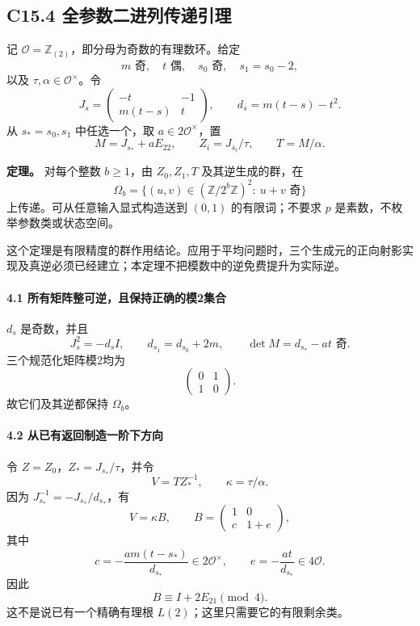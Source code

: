 \subsection*{\texorpdfstring{{C15.4} {全参数二进列传递引理}}{C15.4 全参数二进列传递引理}}\label{C15-h107}

{记} \(\mathcal O=\mathbb Z_{(2)}\){，即分母为奇数的有理数环。给定} \[
m\text{ 奇},\quad t\text{ 偶},\quad s_0\text{ 奇},\quad s_1=s_0-2,
\] {以及} \(\tau,\alpha\in\mathcal O^\times\){。令} \[
J_s=\begin{pmatrix}-t&-1\\m(t-s)&t\end{pmatrix},
\qquad d_s=m(t-s)-t^2.
\] {从} \(s_*=s_0,s_1\) {中任选一个，取} \(a\in2\mathcal O^\times\){，置} \[
M=J_{s_*}+aE_{22},\qquad
Z_i=J_{s_i}/\tau,\qquad T=M/\alpha.
\]

\textbf{{定理。}} {对每个整数} \(b\ge1\){，由} \(Z_0,Z_1,T\) {及其逆生成的群，在} \[
\Omega_b=\{(u,v)\in(\mathbb Z/2^b\mathbb Z)^2:\ u+v\text{ 奇}\}
\] {上传递。可从任意输入显式构造送到} \((0,1)\) {的有限词；不要求} \(p\) {是素数，不枚举参数类或状态空间。}

{这个定理是有限精度的群作用结论。应用于平均问题时，三个生成元的正向射影实现及真逆必须已经建立；本定理不把模数中的逆免费提升为实际逆。}

\paragraph*{\texorpdfstring{{4.1} {所有矩阵整可逆，且保持正确的模2集合}}{4.1 所有矩阵整可逆，且保持正确的模2集合}}\label{C15-h108}

\(d_s\) {是奇数，并且} \[
J_s^2=-d_sI,\qquad
d_{s_1}=d_{s_0}+2m,\qquad
\det M=d_{s_*}-at\text{ 奇}.
\] {三个规范化矩阵模2均为} \[
\begin{pmatrix}0&1\\1&0\end{pmatrix}.
\] {故它们及其逆都保持} \(\Omega_b\){。}

\paragraph*{\texorpdfstring{{4.2} {从已有返回制造一阶下方向}}{4.2 从已有返回制造一阶下方向}}\label{C15-h109}

{令} \(Z=Z_0\){，}\(Z_*=J_{s_*}/\tau\){，并令} \[
V=T Z_*^{-1},\qquad \kappa=\tau/\alpha.
\] {因为} \(J_{s_*}^{-1}=-J_{s_*}/d_{s_*}\){，有} \[
V=\kappa B,\qquad
B=\begin{pmatrix}1&0\\c&1+e\end{pmatrix},
\] {其中} \[
c=-\frac{am(t-s_*)}{d_{s_*}}\in2\mathcal O^\times,
\qquad e=-\frac{at}{d_{s_*}}\in4\mathcal O.
\tag{C15.4.1}
\] {因此} \[
B\equiv I+2E_{21}\pmod4.
\] {这不是说已有一个精确有理根} \(L(2)\){；这里只需要它的有限剩余类。}

